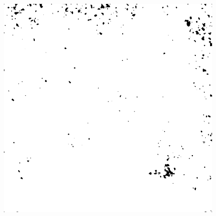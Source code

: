 \begin{figure}[H]
\begin{minipage}[t]{0.3\linewidth}
	\label{fig:hus_m15}
\end{minipage}
\begin{minipage}[t]{0.3\linewidth} %
	\includegraphics[width = 1\linewidth]{gfx/sit/sit_m15.png}
	\label{fig:sit_m15}
\end{minipage}
\end{figure}
